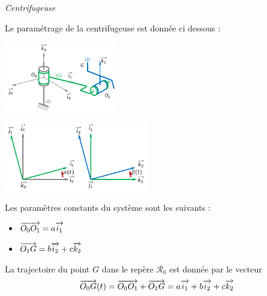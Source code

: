 \documentclass[10pt,oneside]{article}
\begin{document}
\begin{exemple}
\textit{Centrifugeuse}

Le paramétrage de la centrifugeuse est donnée ci dessous : 

\begin{minipage}[c]{.25\linewidth}
\begin{center}
\includegraphics[height=3cm]{png/centrifugeuse_2}
\end{center}
\end{minipage}\hfill
\begin{minipage}[c]{.45\linewidth}
\begin{center}
\includegraphics[height=3cm]{png/centrifugeuse_3}
\end{center}
\end{minipage}\hfill
\begin{minipage}[c]{.25\linewidth}
Les paramètres constants du système sont les suivants : 
\begin{itemize}%
\item $\overrightarrow{O_0O_1} = a \overrightarrow{i_1}$
\item $\overrightarrow{O_1G} = b \overrightarrow{i_2} + c \overrightarrow{k_2}$
\end{itemize}
\end{minipage}

La trajectoire du point $G$ dans le repère $\mathcal{R}_0$  est donnée par le vecteur 
$$
\overrightarrow{O_0 G}(t)  = \overrightarrow{O_0O_1} + \overrightarrow{O_1G}
= a \overrightarrow{i_1} +  b \overrightarrow{i_2} + c \overrightarrow{k_2}
$$


\end{exemple}
\end{document}
